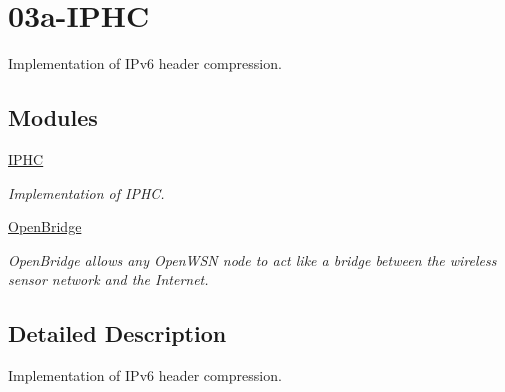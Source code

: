 \hypertarget{group___lo_w_p_a_n}{}\section{03a-\/\+I\+P\+HC}
\label{group___lo_w_p_a_n}


Implementation of I\+Pv6 header compression.  


\subsection*{Modules}
\begin{DoxyCompactItemize}
\item 
\hyperlink{group___i_p_h_c}{I\+P\+HC}
\begin{DoxyCompactList}\small\item\em Implementation of I\+P\+HC. \end{DoxyCompactList}\item 
\hyperlink{group___open_bridge}{Open\+Bridge}
\begin{DoxyCompactList}\small\item\em Open\+Bridge allows any Open\+W\+SN node to act like a bridge between the wireless sensor network and the Internet. \end{DoxyCompactList}\end{DoxyCompactItemize}


\subsection{Detailed Description}
Implementation of I\+Pv6 header compression. 

